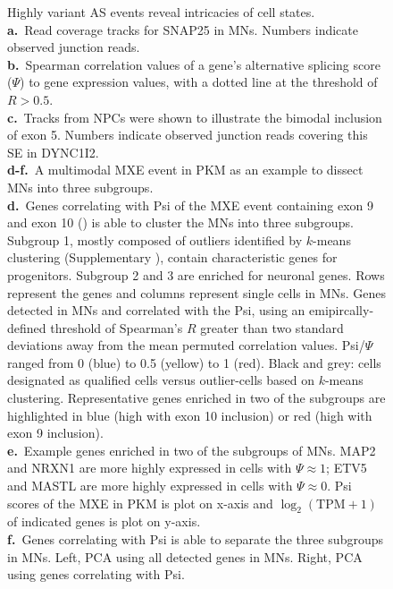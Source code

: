 \clearpage
\thispagestyle{facingcaption}
\begin{figure}[h]
\captionsetup{labelformat=prev-page}
\caption[Highly variant AS events reveal intricacies of cell states.]{
Highly variant AS events reveal intricacies of cell states.\\
\textbf{a.}~Read coverage tracks for SNAP25 in MNs. Numbers indicate observed junction reads.\\
\textbf{b.}~Spearman correlation values of a gene's alternative splicing score ($\Psi$) to gene expression values, with a dotted line at the threshold of $R > 0.5$.\\
\textbf{c.}~Tracks from NPCs were shown to illustrate the bimodal inclusion of exon 5. Numbers indicate observed junction reads covering this SE in DYNC1I2.\\
\textbf{d-f.}~A multimodal MXE event in PKM as an example to dissect MNs into three subgroups.\\
\textbf{d.}~Genes correlating with Psi of the MXE event containing exon 9 and exon 10 () is able to cluster the MNs into three subgroups. Subgroup 1, mostly composed of outliers identified by $k$-means clustering (Supplementary ), contain characteristic genes for progenitors. Subgroup 2 and 3 are enriched for neuronal genes. Rows represent the genes and columns represent single cells in MNs. Genes detected in MNs and correlated with the Psi, using an emipircally-defined threshold of Spearman's $R$ greater than two standard deviations away from the mean permuted correlation values. Psi/$\Psi$ ranged from 0 (blue) to 0.5 (yellow) to 1 (red). Black and grey: cells designated as qualified cells versus outlier-cells based on $k$-means clustering. Representative genes enriched in two of the subgroups are highlighted in blue (high with exon 10 inclusion) or red (high with exon 9 inclusion). \\
\textbf{e.}~Example genes enriched in two of the subgroups of MNs. MAP2 and NRXN1 are more highly expressed in cells with $\Psi \approx 1$; ETV5 and MASTL are more highly expressed in cells with $\Psi \approx 0$. Psi scores of the MXE in PKM is plot on x-axis and $\log_2(\mathrm{TPM}+1)$ of indicated genes is plot on y-axis.\\
\textbf{f.}~Genes correlating with Psi is able to separate the three subgroups in MNs. Left, PCA using all detected genes in MNs. Right, PCA using genes correlating with Psi.\\
}
\end{figure}
